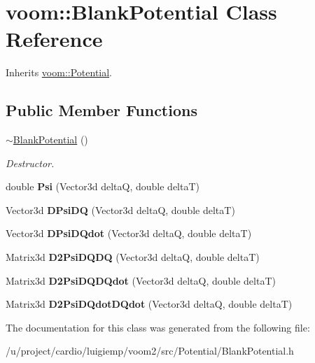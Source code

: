 \hypertarget{classvoom_1_1_blank_potential}{
\section{voom::BlankPotential Class Reference}
\label{classvoom_1_1_blank_potential}
}


Inherits \hyperlink{classvoom_1_1_potential}{voom::Potential}.\subsection*{Public Member Functions}
\begin{DoxyCompactItemize}
\item 
\hypertarget{classvoom_1_1_blank_potential_a751654100a3cb50ffe1909beb3a3bda8}{
\hyperlink{classvoom_1_1_blank_potential_a751654100a3cb50ffe1909beb3a3bda8}{$\sim$BlankPotential} ()}
\label{classvoom_1_1_blank_potential_a751654100a3cb50ffe1909beb3a3bda8}

\begin{DoxyCompactList}\small\item\em Destructor. \item\end{DoxyCompactList}\item 
\hypertarget{classvoom_1_1_blank_potential_a36249cf0ec81043b3d0bacb3e8f9b2ba}{
double {\bfseries Psi} (Vector3d deltaQ, double deltaT)}
\label{classvoom_1_1_blank_potential_a36249cf0ec81043b3d0bacb3e8f9b2ba}

\item 
\hypertarget{classvoom_1_1_blank_potential_aac7229746453aa2d681f8c2db6ddd5b1}{
Vector3d {\bfseries DPsiDQ} (Vector3d deltaQ, double deltaT)}
\label{classvoom_1_1_blank_potential_aac7229746453aa2d681f8c2db6ddd5b1}

\item 
\hypertarget{classvoom_1_1_blank_potential_ae379f2938db8c5e2e4cd0a1d9945fab0}{
Vector3d {\bfseries DPsiDQdot} (Vector3d deltaQ, double deltaT)}
\label{classvoom_1_1_blank_potential_ae379f2938db8c5e2e4cd0a1d9945fab0}

\item 
\hypertarget{classvoom_1_1_blank_potential_aaca367894c45f75273027a43969b9ef9}{
Matrix3d {\bfseries D2PsiDQDQ} (Vector3d deltaQ, double deltaT)}
\label{classvoom_1_1_blank_potential_aaca367894c45f75273027a43969b9ef9}

\item 
\hypertarget{classvoom_1_1_blank_potential_a71f7f8f5ab8aa8e5c0b1d32264204c97}{
Matrix3d {\bfseries D2PsiDQDQdot} (Vector3d deltaQ, double deltaT)}
\label{classvoom_1_1_blank_potential_a71f7f8f5ab8aa8e5c0b1d32264204c97}

\item 
\hypertarget{classvoom_1_1_blank_potential_a2e277bfcf2a3880e61e4cee7714a6c7a}{
Matrix3d {\bfseries D2PsiDQdotDQdot} (Vector3d deltaQ, double deltaT)}
\label{classvoom_1_1_blank_potential_a2e277bfcf2a3880e61e4cee7714a6c7a}

\end{DoxyCompactItemize}


The documentation for this class was generated from the following file:\begin{DoxyCompactItemize}
\item 
/u/project/cardio/luigiemp/voom2/src/Potential/BlankPotential.h\end{DoxyCompactItemize}
